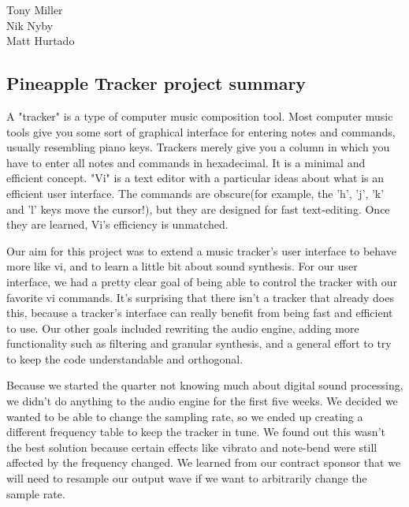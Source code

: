 \documentclass[12pt,letterpaper]{article}
\begin{document}
\begin{flushright}
Tony Miller\\
Nik Nyby\\
Matt Hurtado
\end{flushright}

\begin{center}
\section*{Pineapple Tracker project summary}
\end{center}


\doublespacing
\par
A "tracker" is a type of computer music composition tool. Most computer music tools give you some sort of graphical interface for entering notes and commands, usually resembling piano keys. Trackers merely give you a column in which you have to enter all notes and commands in hexadecimal. It is a minimal and efficient concept. "Vi" is a text editor with a particular ideas about what is an efficient user interface. The commands are obscure(for example, the 'h', 'j', 'k' and 'l' keys move the cursor!), but they are designed for fast text-editing. Once they are learned, Vi's efficiency is unmatched.
\par
Our aim for this project was to extend a music tracker's user interface to behave more like vi, and to learn a little bit about sound synthesis. For our user interface, we had a pretty clear goal of being able to control the tracker with our favorite vi commands. It's surprising that there isn't a tracker that already does this, because a tracker's interface can really benefit from being fast and efficient to use. Our other goals included rewriting the audio engine, adding more functionality such as filtering and granular synthesis, and a general effort to try to keep the code understandable and orthogonal.

\par
Because we started the quarter not knowing much about digital sound processing, we didn't do anything to the audio engine for the first five weeks. We decided we wanted to be able to change the sampling rate, so we ended up creating a different frequency table to keep the tracker in tune. We found out this wasn't the best solution because certain effects like vibrato and note-bend were still affected by the frequency changed. We learned from our contract sponsor that we will need to resample our output wave if we want to arbitrarily change the sample rate.

\par
\end{document}
